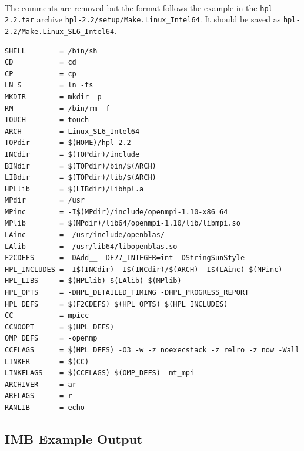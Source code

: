 \documentclass{article}
\newenvironment{code}{\captionsetup{type=listing}}{}
\begin{document}
    \paragraph{}
    The comments are removed but the format follows the example in the \verb|hpl-2.2.tar| archive \verb|hpl-2.2/setup/Make.Linux_Intel64|. It should be saved as \verb|hpl-2.2/Make.Linux_SL6_Intel64|.
        \begin{code}
        \label{code:builds-cloud-make-linux_sl6_intel64}
        \begin{verbatim}
SHELL        = /bin/sh
CD           = cd
CP           = cp
LN_S         = ln -fs
MKDIR        = mkdir -p
RM           = /bin/rm -f
TOUCH        = touch
ARCH         = Linux_SL6_Intel64
TOPdir       = $(HOME)/hpl-2.2
INCdir       = $(TOPdir)/include
BINdir       = $(TOPdir)/bin/$(ARCH)
LIBdir       = $(TOPdir)/lib/$(ARCH)
HPLlib       = $(LIBdir)/libhpl.a
MPdir        = /usr
MPinc        = -I$(MPdir)/include/openmpi-1.10-x86_64
MPlib        = $(MPdir)/lib64/openmpi-1.10/lib/libmpi.so
LAinc        =  /usr/include/openblas/
LAlib        =  /usr/lib64/libopenblas.so
F2CDEFS      = -DAdd__ -DF77_INTEGER=int -DStringSunStyle
HPL_INCLUDES = -I$(INCdir) -I$(INCdir)/$(ARCH) -I$(LAinc) $(MPinc)
HPL_LIBS     = $(HPLlib) $(LAlib) $(MPlib)
HPL_OPTS     = -DHPL_DETAILED_TIMING -DHPL_PROGRESS_REPORT
HPL_DEFS     = $(F2CDEFS) $(HPL_OPTS) $(HPL_INCLUDES)
CC           = mpicc
CCNOOPT      = $(HPL_DEFS)
OMP_DEFS     = -openmp
CCFLAGS      = $(HPL_DEFS) -O3 -w -z noexecstack -z relro -z now -Wall
LINKER       = $(CC)
LINKFLAGS    = $(CCFLAGS) $(OMP_DEFS) -mt_mpi
ARCHIVER     = ar
ARFLAGS      = r
RANLIB       = echo

        \end{verbatim}
        \end{code}

    \subsection{IMB Example Output}
        \label{appendix:imb-example-output}
\end{document}
